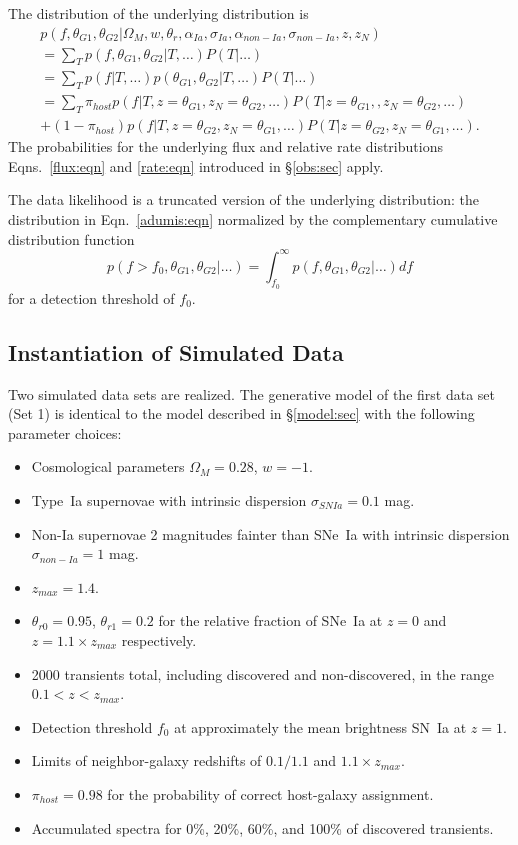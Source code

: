 \documentclass[preprint,3p]{elsarticle}
\begin{document}
The distribution of the underlying distribution is 
\begin{multline}
p(f, \theta_{G1}, \theta_{G2} | \Omega_M, w, \theta_r, \alpha_{Ia},\sigma_{Ia}, \alpha_{\mathit{non-Ia}},\sigma_{\mathit{non-Ia}}, z, z_N)  \\
= \sum_{T} p(f, \theta_{G1}, \theta_{G2}| T, \ldots)P(T| \ldots)\\
 =\sum_{T} p(f| T, \ldots)p(\theta_{G1}, \theta_{G2}| T, \ldots) P(T| \ldots) \\
= \sum_{T} \pi_{host} p(f| T, z=\theta_{G1} ,z_N=\theta_{G2}, \ldots) P(T| z=\theta_{G1}, ,z_N=\theta_{G2}, \ldots)  \\
 +  (1-\pi_{host}) p(f| T, z=\theta_{G2}, z_N=\theta_{G1}, \ldots) P(T| z=\theta_{G2}, z_N=\theta_{G1}, \ldots).
\label{adumis:eqn}
\end{multline}
The probabilities  for the underlying flux and
relative rate distributions
 Eqns.~\ref{flux:eqn} and \ref{rate:eqn} introduced in \S\ref{obs:sec} apply.

The data likelihood is a truncated version of the
underlying distribution: the distribution in  Eqn.~\ref{adumis:eqn} normalized by
the complementary cumulative distribution function
\begin{equation}
p(f>f_0, \theta_{G1}, \theta_{G2}|\ldots) = \int_{f_0}^{\infty} p(f, \theta_{G1}, \theta_{G2}|\ldots)df
\end{equation}
for a detection threshold of $f_0$.

\subsection{Instantiation of Simulated Data}
Two simulated data sets are realized.
The generative model of the first data set (Set 1) is
 identical to the model described in \S\ref{model:sec} with the following parameter choices:
\begin{itemize}
\item Cosmological parameters $\Omega_M=0.28$, $w=-1$.
\item Type~Ia supernovae with intrinsic dispersion $\sigma_{SNIa}=0.1$ mag.
\item Non-Ia supernovae 2 magnitudes fainter than SNe~Ia with intrinsic
dispersion $\sigma_{non-Ia}=1$ mag.
\item $z_{max}=1.4$.
\item $\theta_{r0}=0.95$, $\theta_{r1}=0.2$ for the relative fraction of SNe~Ia
at $z=0$ and $z=1.1 \times z_{max}$ respectively.
\item 2000 transients total, including discovered and non-discovered,
in the range $0.1<z<z_{max}$.
\item Detection threshold $f_0$ at approximately the mean brightness SN~Ia at $z=1$.
\item Limits of neighbor-galaxy redshifts of $0.1/1.1$ and $1.1\times z_{max}$.
\item $\pi_{host}=0.98$ for the probability of correct host-galaxy assignment.
\item Accumulated spectra for 0\%, 20\%, 60\%, and 100\% of discovered transients.
\end{itemize}
\end{document}

